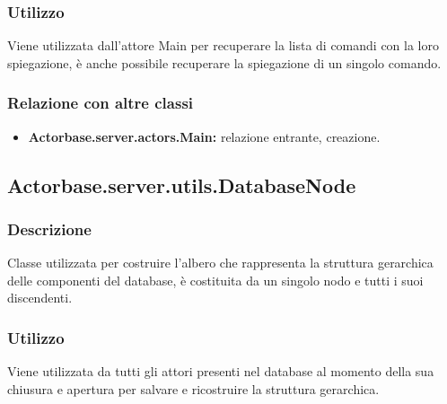 \documentclass[a4paper]{article}
\begin{document}
			\subsubsection{Utilizzo}
				Viene utilizzata dall'attore Main per recuperare la lista di comandi con la loro spiegazione, è anche possibile recuperare 
				la spiegazione di un singolo comando.
				
			\subsubsection{Relazione con altre classi}
				\begin{itemize}
					\item \textbf{Actorbase.server.actors.Main:} relazione entrante, creazione. 
				\end{itemize}
			
		\subsection{Actorbase.server.utils.DatabaseNode}
			\subsubsection{Descrizione}
				Classe utilizzata per costruire l'albero che rappresenta la struttura gerarchica delle componenti del database,
				è costituita da un singolo nodo e tutti i suoi discendenti.
				
			\subsubsection{Utilizzo}
				Viene utilizzata da tutti gli attori presenti nel database al momento della sua chiusura e apertura per salvare e ricostruire 
				la struttura gerarchica.
				
\end{document}

